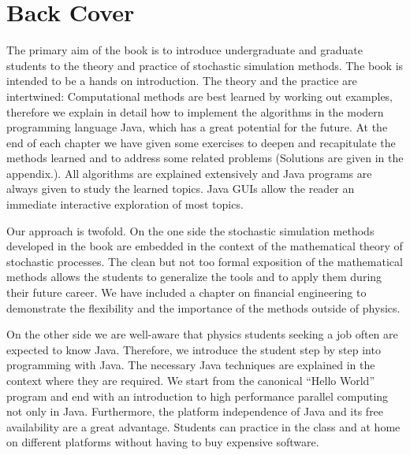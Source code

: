 

\chapter*{Back Cover}

\thispagestyle{empty}

The primary aim of the book is to introduce undergraduate and graduate 
students to the theory and practice of stochastic simulation methods.
The book is intended to be a  hands on introduction. 
The theory and the practice are intertwined:  Computational methods are 
best learned by working out examples, therefore we explain in detail how to 
implement the algorithms in the modern programming language Java, which has 
a great 
potential for the future. At the end of each chapter we have given
some exercises to deepen and recapitulate the methods learned and to
address some related problems (Solutions are given in the appendix.).
All algorithms are explained extensively and 
Java programs are always given to study the learned topics.
Java GUIs allow the reader an immediate interactive exploration of
most topics.

Our approach is twofold. On the one side the  stochastic simulation
methods developed in the book are embedded in the context of the
mathematical theory of stochastic processes. The clean but not too formal 
exposition of the mathematical methods allows
the students to generalize the tools and to apply them during their future 
career. We have included a chapter on financial engineering to
demonstrate the flexibility and the importance of the methods outside of
physics. 

On the other side we are well-aware that physics students seeking a
job often are expected to know Java.  Therefore, we introduce the
student step by step into programming with Java. The necessary Java
techniques are explained in the context where they are required.
We start from the canonical ``Hello World'' program and end with an 
introduction to high performance parallel computing not only in Java.
Furthermore, the platform independence of Java and its free
availability are  a great advantage. Students can practice in the class 
and at home on different platforms without having to buy expensive
software. 


